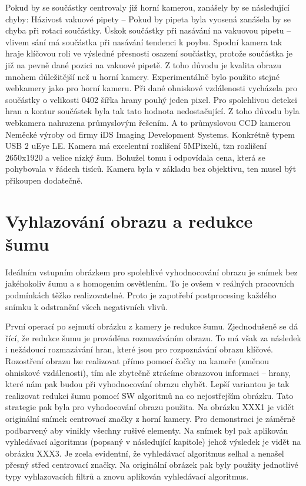Pokud by se součástky centrovaly již horní kamerou, zanášely by se následující chyby:
Házivost vakuové pipety – Pokud by pipeta byla vyosená zanášela by se chyba při rotaci součástky.
Úskok součástky při nasávání na vakuovou pipetu – vlivem sání má součástka při nasávání tendenci k poybu.
Spodní kamera tak hraje klíčovou roli ve výsledné přesnosti osazení součástky, protože součástka je již na pevně dané pozici na vakuové pipetě. 
Z toho důvodu je kvalita obrazu mnohem důležitější než u horní kamery.  Experimentálně bylo použito stejné webkamery jako pro horní kameru. Při dané ohniskové vzdálenosti vycházela pro součástky o velikosti 0402 šířka hrany pouhý jeden pixel. Pro spolehlivou detekci hran a kontur součástek byla tak tato hodnota nedostačující. Z toho důvodu byla webkamera nahrazena průmyslovým řešením. A to průmyslovou CCD kamerou Neměcké výroby od firmy iDS Imaging Development Systems. Konkrétně typem USB 2 uEye LE. Kamera má excelentní rozlišení 5MPixelů, tzn rozlišení 2650x1920 a velice nízký šum. Bohužel tomu i odpovídala cena, která se pohybovala v řádech tisíců. Kamera byla v základu bez objektivu, ten musel být přikoupen dodatečně.


\section{Vyhlazování obrazu a redukce šumu}
Ideálním vstupním obrázkem pro spolehlivé vyhodnocování obrazu je snímek bez jakéhokoliv šumu a s homogením osvětlením. To je ovšem v reálných pracovních podmínkách těžko realizovatelné. Proto je zapotřebí postprocesing každého snímku k odstranění všech negativních vlivů.


První operací po sejmutí obrázku z kamery je redukce šumu. Zjednodušeně se dá řící, že redukce šumu je prováděna rozmazáváním obrazu. To má však za následek i nežádoucí rozmazávání hran, které jsou pro rozpoznávání obrazu klíčové. Rozostření obrazu lze realizovat přímo pomocí čočky na kameře (změnou ohniskové vzdálenosti), tím ale zbytečně ztrácíme obrazovou informaci – hrany, které nám pak budou při vyhodnocování obrazu chybět. Lepší variantou je tak realizovat redukci šumu pomocí SW algoritmů na co nejostřejším obrázku. Tato strategie pak byla pro vyhodocování obrazu použita. Na obrázku XXX1 je vidět originální snímek centrovací značky z horní kamery. Pro demonstraci je záměrně podbarvený aby vinikly všechny rušivé elementy. Na snímek byl pak aplikován vyhledávací algoritmus (popsaný v následující kapitole) jehož výsledek je vidět na obrázku XXX3.  Je zcela evidentní, že vyhledávací algoritmus selhal a nenašel přesný střed  centrovací značky. Na originální obrázek pak byly použity jednotlivé typy vyhlazovacích filtrů a znovu aplikován vyhledávací algoritmus. 

